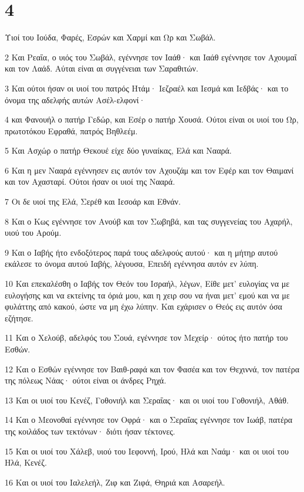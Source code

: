\chapter{4}

\par Υιοί του Ιούδα, Φαρές, Εσρών και Χαρμί και Ωρ και Σωβάλ.
\par 2 Και Ρεαΐα, ο υιός του Σωβάλ, εγέννησε τον Ιαάθ· και Ιαάθ εγέννησε τον Αχουμαΐ και τον Λαάδ. Αύται είναι αι συγγένειαι των Σαραθιτών.
\par 3 Και ούτοι ήσαν οι υιοί του πατρός Ητάμ· Ιεζραέλ και Ιεσμά και Ιεδβάς· και το όνομα της αδελφής αυτών Ασέλ-ελφονί·
\par 4 και Φανουήλ ο πατήρ Γεδώρ, και Εσέρ ο πατήρ Χουσά. Ούτοι είναι οι υιοί του Ωρ, πρωτοτόκου Εφραθά, πατρός Βηθλεέμ.
\par 5 Και Ασχώρ ο πατήρ Θεκουέ είχε δύο γυναίκας, Ελά και Νααρά.
\par 6 Και η μεν Νααρά εγέννησεν εις αυτόν τον Αχουζάμ και τον Εφέρ και τον Θαιμανί και τον Αχασταρί. Ούτοι ήσαν οι υιοί της Νααρά.
\par 7 Οι δε υιοί της Ελά, Σερέθ και Ιεσοάρ και Εθνάν.
\par 8 Και ο Κως εγέννησε τον Ανούβ και τον Σωβηβά, και τας συγγενείας του Αχαρήλ, υιού του Αρούμ.
\par 9 Και ο Ιαβής ήτο ενδοξότερος παρά τους αδελφούς αυτού· και η μήτηρ αυτού εκάλεσε το όνομα αυτού Ιαβής, λέγουσα, Επειδή εγέννησα αυτόν εν λύπη.
\par 10 Και επεκαλέσθη ο Ιαβής τον Θεόν του Ισραήλ, λέγων, Είθε μετ' ευλογίας να με ευλογήσης και να εκτείνης τα όριά μου, και η χειρ σου να ήναι μετ' εμού και να με φυλάττης από κακού, ώστε να μη έχω λύπην. Και εχάρισεν ο Θεός εις αυτόν όσα εζήτησε.
\par 11 Και ο Χελούβ, αδελφός του Σουά, εγέννησε τον Μεχείρ· ούτος ήτο πατήρ του Εσθών.
\par 12 Και ο Εσθών εγέννησε τον Βαιθ-ραφά και τον Φασέα και τον Θεχιννά, τον πατέρα της πόλεως Νάας· ούτοι είναι οι άνδρες Ρηχά.
\par 13 Και οι υιοί του Κενέζ, Γοθονιήλ και Σεραΐας· και οι υιοί του Γοθονιήλ, Αθάθ.
\par 14 Και ο Μεονοθαί εγέννησε τον Οφρά· και ο Σεραΐας εγέννησε τον Ιωάβ, πατέρα της κοιλάδος των τεκτόνων· διότι ήσαν τέκτονες.
\par 15 Και οι υιοί του Χάλεβ, υιού του Ιεφοννή, Ιρού, Ηλά και Ναάμ· και οι υιοί του Ηλά, Κενέζ.
\par 16 Και οι υιοί του Ιαλελεήλ, Ζιφ και Ζιφά, Θηριά και Ασαρεήλ.
